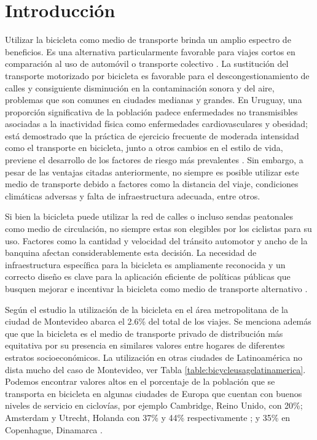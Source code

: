 \documentclass{article}
\begin{document}
  \section{Introducción}

  Utilizar la bicicleta como medio de transporte brinda un amplio espectro de beneficios. Es una alternativa particularmente favorable para viajes cortos en comparación al uso de automóvil o transporte colectivo \cite{Hull2014}. La sustitución del transporte motorizado por bicicleta es favorable para el descongestionamiento de calles y consiguiente disminución en la contaminación sonora y del aire, problemas que son comunes en ciudades medianas y grandes. En Uruguay, una proporción significativa de la población padece enfermedades no transmisibles asociadas a la inactividad física como enfermedades cardiovasculares y obesidad; está demostrado que la práctica de ejercicio frecuente de moderada intensidad como el transporte en bicicleta, junto a otros cambios en el estilo de vida, previene el desarrollo de los factores de riesgo más prevalentes \cite{heartrisksuy} \cite{mspphisicalactivityguid} \cite{mspsurveyriskfactors}. Sin embargo, a pesar de las ventajas citadas anteriormente, no siempre es posible utilizar este medio de transporte debido a factores como la distancia del viaje, condiciones climáticas adversas y falta de infraestructura adecuada, entre otros.

  Si bien la bicicleta puede utilizar la red de calles o incluso sendas peatonales como medio de circulación, no siempre estas son elegibles por los ciclistas para su uso. Factores como la cantidad y velocidad del tránsito automotor y ancho de la banquina afectan considerablemente esta decisión. La necesidad de infraestructura específica para la bicicleta es ampliamente reconocida y un correcto diseño es clave para la aplicación eficiente de políticas públicas que busquen mejorar e incentivar la bicicleta como medio de transporte alternativo \cite{hunt2007}.

  Según el estudio \cite{Mauttone2017a} la utilización de la bicicleta en el área metropolitana de la ciudad de Montevideo abarca el 2.6\% del total de los viajes. Se menciona además que que la bicicleta es el medio de transporte privado de distribución más equitativa por su presencia en similares valores entre hogares de diferentes estratos socioeconómicos. La utilización en otras ciudades de Latinoamérica no dista mucho del caso de Montevideo, ver Tabla \ref{table:bicycleusagelatinamerica}. Podemos encontrar valores altos en el porcentaje de la población que se transporta en bicicleta en algunas ciudades de Europa que cuentan con buenos niveles de servicio en ciclovías, por ejemplo Cambridge, Reino Unido, con 20\%; Amsterdam y Utrecht, Holanda con 37\% y 44\% respectivamente \cite{Hull2014}; y 35\% en Copenhague, Dinamarca \cite{Vedel2017}.
\end{document}
